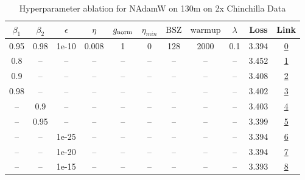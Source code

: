 \begin{table}[H]
\centering
\caption{Hyperparameter ablation for NAdamW on 130m on 2x Chinchilla Data}
\label{tab:ablation_nadamw_130m_on_2x_chinchilla_data}
\begin{tabular}{ccccccccccc}
\toprule
$\beta_1$ & $\beta_2$ & $\epsilon$ & $\eta$ & $g_{\mathrm{norm}}$ & $\eta_{min}$ & $\mathrm{BSZ}$ & $\mathrm{warmup}$ & $\lambda$ & Loss & Link \\
\midrule
0.95 & 0.98 & 1e-10 & 0.008 & 1 & 0 & 128 & 2000 & 0.1 & 3.394 & \href{https://wandb.ai/marin-community/optimizer-scaling/runs/sweep-130m-5B-nadamw1c5657lr0.008-wd0.1-minlr0-warmup2000-b10.95-2e57b5}{0} \\
\midrule
0.8 & -- & -- & -- & -- & -- & -- & -- & -- & 3.452 & \href{https://wandb.ai/marin-community/optimizer-scaling/runs/sweep-130m-5B-nadamw145e13lr0.008-wd0.1-minlr0-warmup2000-b10.8--6616c2}{1} \\
0.9 & -- & -- & -- & -- & -- & -- & -- & -- & 3.408 & \href{https://wandb.ai/marin-community/optimizer-scaling/runs/sweep-130m-5B-nadamwc38fe0lr0.008-wd0.1-minlr0-warmup2000-b10.9--6a46e9}{2} \\
0.98 & -- & -- & -- & -- & -- & -- & -- & -- & 3.402 & \href{https://wandb.ai/marin-community/optimizer-scaling/runs/sweep-130m-5B-nadamw32e168lr0.008-wd0.1-minlr0-warmup2000-b10.98-4a84a1}{3} \\
-- & 0.9 & -- & -- & -- & -- & -- & -- & -- & 3.403 & \href{https://wandb.ai/marin-community/optimizer-scaling/runs/sweep-130m-5B-nadamw5addd4lr0.008-wd0.1-minlr0-warmup2000-b10.95-29b3aa}{4} \\
-- & 0.95 & -- & -- & -- & -- & -- & -- & -- & 3.399 & \href{https://wandb.ai/marin-community/optimizer-scaling/runs/sweep-130m-5B-nadamwdd3b0blr0.008-wd0.1-minlr0-warmup2000-b10.95-20518c}{5} \\
-- & -- & 1e-25 & -- & -- & -- & -- & -- & -- & 3.394 & \href{https://wandb.ai/marin-community/optimizer-scaling/runs/sweep-130m-5B-nadamwca7dc8lr0.008-wd0.1-minlr0-warmup2000-b10.95-6aab84}{6} \\
-- & -- & 1e-20 & -- & -- & -- & -- & -- & -- & 3.394 & \href{https://wandb.ai/marin-community/optimizer-scaling/runs/sweep-130m-5B-nadamwf3a9adlr0.008-wd0.1-minlr0-warmup2000-b10.95-ab0d37}{7} \\
-- & -- & 1e-15 & -- & -- & -- & -- & -- & -- & 3.393 & \href{https://wandb.ai/marin-community/optimizer-scaling/runs/sweep-130m-5B-nadamw153a2alr0.008-wd0.1-minlr0-warmup2000-b10.95-d349f4}{8} \\

\end{tabular}
\end{table}
